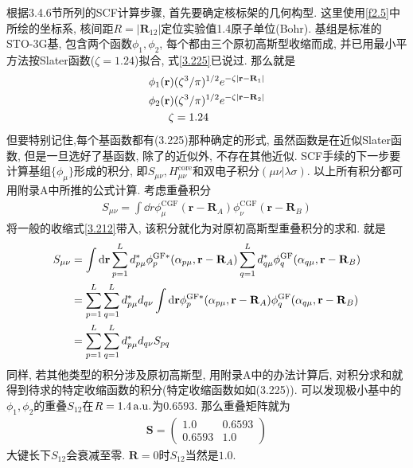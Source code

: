 根据3.4.6节所列的SCF计算步骤, 首先要确定核标架的几何构型. 这里使用\ref{f2.5}中所绘的坐标系, 核间距$R=|\mathbf{R}_{12}|$定位实验值1.4原子单位(Bohr). 基组是标准的STO-3G基, 包含两个函数$\phi_1,\phi_2$, 每个都由三个原初高斯型收缩而成, 并已用最小平方法按Slater函数($\zeta=1.24$)拟合, 式\eqref{3.225}已说过. 那么就是
\begin{equation}
\begin{split}
\phi_1(\mathbf{r}) & (\zeta^3/\pi)^{1/2}e^{-\zeta|\mathbf{r-R}_1|}\\
\phi_2(\mathbf{r}) & (\zeta^3/\pi)^{1/2}e^{-\zeta|\mathbf{r-R}_2|}\\
\zeta & = 1.24
\end{split}
\end{equation}
但要特别记住,每个基函数都有(3.225)那种确定的形式, 虽然函数是在近似Slater函数, 但是一旦选好了基函数, 除了\hft 的近似外, 不存在其他近似. SCF手续的下一步要计算基组$\{\phi_\mu\}$形成的积分, 即$S_{\mu\nu}, H_{\mu\nu}^\mathrm{core}$和双电子积分$(\mu\nu|\lambda\sigma)$. 以上所有积分都可用附录A中所推的公式计算. 考虑重叠积分
\begin{align}
S_{\mu\nu} = \int\dd{r}\phi_\mu^\mathrm{CGF}(\mathbf{r-R}_A)\phi_\nu^\mathrm{CGF}(\mathbf{r-R}_B)
\end{align}
将一般的收缩式\eqref{3.212}带入, 该积分就化为对原初高斯型重叠积分的求和. 就是
\begin{align}
S_{\mu\nu} & = \int\dd{r}\sum_{p=1}^{L}d_{p\mu}^*\phi_p^\mathrm{GF*}(\alpha_{p\mu},\mathbf{r-R}_A)\sum_{q=1}^{L}d_{q\mu}^*\phi_q^\mathrm{GF}(\alpha_{q\mu},\mathbf{r-R}_B)\notag\\
& = \sum_{p=1}^{L}\sum_{q=1}^{L} d_{p\mu}^*d_{q\nu}\int\dd{r}\phi_p^\mathrm{GF*}(\alpha_{p\mu},\mathbf{r-R}_A)\phi_q^\mathrm{GF}(\alpha_{q\mu},\mathbf{r-R}_B)\notag\\
& = \sum_{p=1}^{L}\sum_{q=1}^{L}d^*_{p\mu}d_{q\nu}S_{pq}
\end{align}
同样, 若其他类型的积分涉及原初高斯型, 用附录A中的办法计算后, 对积分求和就得到待求的特定收缩函数的积分(特定收缩函数如如(3.225)). 可以发现极小基中的$\phi_1,\phi_2$的重叠$S_{12}$在$R=1.4\,\mathrm{a.u.}$为$0.6593$. 那么重叠矩阵就为
\begin{align}
\mathbf{S} = 
\begin{pmatrix}
1.0 & 0.6593\\0.6593 & 1.0
\end{pmatrix}
\end{align}
大键长下$S_{12}$会衰减至零. $\mathbf{R}=0$时$S_{12}$当然是$1.0$.

